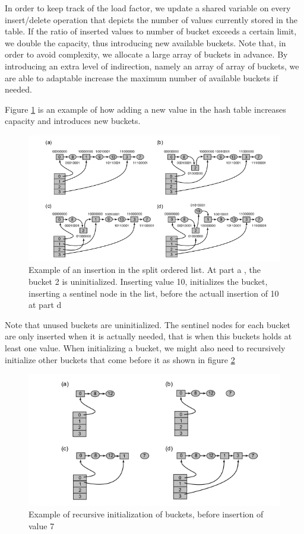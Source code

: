 In order to keep track of the load factor, we update a shared variable on every insert/delete operation that depicts the number of values currently stored in the table. If the ratio of inserted values to number of bucket exceeds a certain limit, we double the capacity, thus introducing new available buckets. Note that, in order to avoid complexity, we allocate a large array of buckets in advance. By introducing an extra level of indirection, namely an array of array of buckets, we are able to adaptable increase the maximum number of available buckets if needed.

Figure \ref{split_ordered_2} is an example of how adding a new value in the hash table increases capacity and introduces new buckets.

\begin{figure}
 \centering
  \includegraphics[scale=0.5]{split_ordered_2.png}
\caption{Example of an insertion in the split ordered list. At part a , the bucket 2 is uninitialized. Inserting value 10, initializes the bucket, inserting a sentinel node in the list, before the actuall insertion of 10 at part d}
\label{split_ordered_2}
\end{figure}

Note that unused buckets are uninitialized. The sentinel nodes for each bucket are only inserted when it is actually needed, that is when this buckets holds at least one value. When initializing a bucket, we might also need to recursively initialize other buckets that come before it as shown in figure \ref{split_ordered_3}

\begin{figure}
 \centering
  \includegraphics[scale=0.5]{split_ordered_3.png}
\caption{Example of recursive initialization of buckets, before insertion of value 7}
\label{split_ordered_3}
\end{figure}

